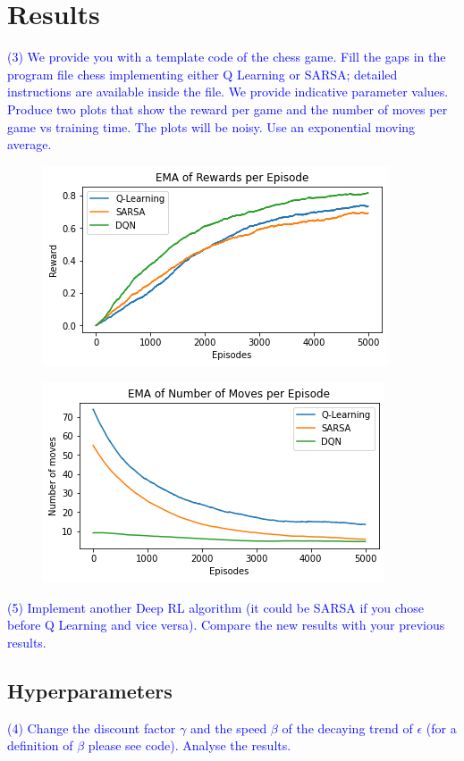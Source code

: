 \documentclass[conference]{IEEEtran}
\begin{document}
\section{Results}\label{sec:results}

\textcolor{blue}{(3) We provide you with a template code of the chess game. Fill the gaps in the
program file chess implementing either Q Learning or SARSA; detailed instructions
are available inside the file. We provide indicative parameter values. Produce two
plots that show the reward per game and the number of moves per game vs training
time. The plots will be noisy. Use an exponential moving average.}

\begin{figure}
    \centering
    \includegraphics[width=.45\textwidth]{../figures/ema_rewards_per_episode_comparison.png}
\end{figure}

\begin{figure}
    \centering
    \includegraphics[width=.45\textwidth]{../figures/ema_number_of_moves_per_episode_comparison.png}
\end{figure}


\textcolor{blue}{(5) Implement another Deep RL algorithm (it could be SARSA if you chose before Q
Learning and vice versa). Compare the new results with your previous results.}

\subsection{Hyperparameters}

\textcolor{blue}{(4) Change the discount factor $\gamma$ and the speed $\beta$ of the decaying trend of $\epsilon$ (for a definition of $\beta$ please see code). Analyse the results.}
\end{document}
